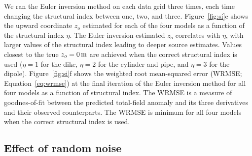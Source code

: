 We ran the Euler inversion method on each data grid three times, each time changing the structural index between one, two, and three.
Figure~\ref{fig:si}e shows the upward coordinate $z_o$ estimated for each of the four models as a function of the structural index $\eta$.
The Euler inversion estimated $z_o$ correlates with $\eta$, with larger values of the structural index leading to deeper source estimates.
Values closest to the true $z_o=\SynSITrueUp$ are achieved when the correct structural index is used ($\eta=1$ for the dike, $\eta=2$ for the cylinder and pipe, and $\eta=3$ for the dipole).
Figure~\ref{fig:si}f shows the weighted root mean-squared error (WRMSE; Equation~\ref{eq:wrmse}) at the final iteration of the Euler inversion method for all four models as a function of structural index.
The WRMSE is a measure of goodnes-of-fit between the predicted total-field anomaly and its three derivatives and their observed counterparts.
The WRMSE is minimum for all four models when the correct structural index is used.


\subsection{Effect of random noise}
\label{sec:noise}


